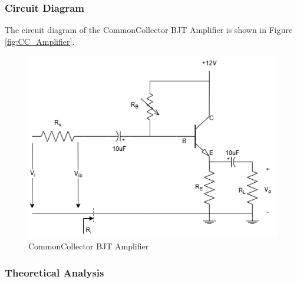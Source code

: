     \subsubsection{Circuit Diagram}
        The circuit diagram of the Common\-Collector BJT Amplifier is shown in Figure \ref{fig:CC_Amplifier}.
        \begin{figure}[H]
            \centering
            \includegraphics[width=0.5\linewidth]{Experiment_07/Circuit/Lab7.drawio.png}
            \caption{Common\-Collector BJT Amplifier}
        \end{figure}

    \subsubsection{Theoretical Analysis}

